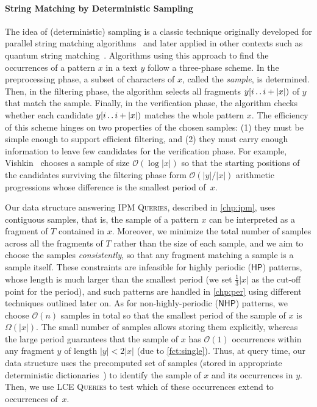 \documentclass[a4paper]{article}
\theoremstyle{definition}
\theoremstyle{remark}
\newcommand{\IPM}{\textsc{IPM Queries}\xspace}
\newcommand{\LCEQ}{\textsc{LCE Queries}\xspace}
\newcommand{\N}{\mathsf{NHP}}
\newcommand{\HP}{\mathsf{HP}}
\newcommand{\dd}{\mathinner{\ldotp\ldotp}}
\newcommand{\Oh}{\mathcal{O}}
\begin{document}
\paragraph{String Matching by Deterministic Sampling}\label{sec:samp}
The idea of (deterministic) sampling is a classic technique originally developed for parallel string matching algorithms~\cite{DBLP:journals/siamcomp/Vishkin91} and later applied in other contexts such as quantum string matching~\cite{DBLP:journals/jda/HariharanV03}.
Algorithms using this approach to find the occurrences of a pattern $x$ in a text $y$ follow a three-phase scheme.
In the preprocessing phase, a subset of characters of $x$, called the \emph{sample}, is determined.
Then, in the filtering phase, the algorithm selects all fragments $y[i\dd i+|x|)$ of $y$ that match the sample.
Finally, in the verification phase, the algorithm checks whether each candidate $y[i\dd i+|x|)$ matches the whole pattern $x$.
The efficiency of this scheme hinges on two properties of the chosen samples: (1) they must be simple enough to support efficient filtering,
and (2) they must carry enough information to leave few candidates for the verification phase.
For example, Vishkin~\cite{DBLP:journals/siamcomp/Vishkin91} chooses a sample of size $\Oh(\log |x|)$ so that the starting positions of the candidates surviving the filtering phase form $\Oh(|y|/|x|)$ arithmetic progressions whose difference is the smallest period of~$x$.

Our data structure answering \IPM, described in \cref{chp:ipm}, uses contiguous samples, that is, the sample of a pattern $x$ can be interpreted as a fragment of $T$ contained in $x$. Moreover, we minimize the total number of samples across all the fragments of $T$ rather than the size of each sample,
and we aim to choose the samples \emph{consistently}, so that any fragment matching a sample is a sample itself.
These constraints are infeasible for highly periodic ($\HP$) patterns, whose length is much larger than the smallest period (we set $\frac13|x|$ as the cut-off point for the period), and such patterns are handled in \cref{chp:per} using different techniques outlined later on.
As for non-highly-periodic ($\N$) patterns, we choose $\Oh(n)$ samples in total so that the smallest period of the sample of $x$ is $\Omega(|x|)$.
The small number of samples allows storing them explicitly, whereas the large period guarantees that the sample of $x$ has $\Oh(1)$ occurrences within any fragment $y$ of length $|y|<2|x|$ (due to \cref{fct:single}).
Thus, at query time, our data structure uses the precomputed set of samples (stored in appropriate deterministic dictionaries~\cite{DBLP:conf/icalp/Ruzic08,DBLP:conf/focs/PatrascuT14}) to identify the sample of $x$ and its occurrences in $y$.
Then, we use \LCEQ to test which of these occurrences extend to occurrences of~$x$.
\end{document}

